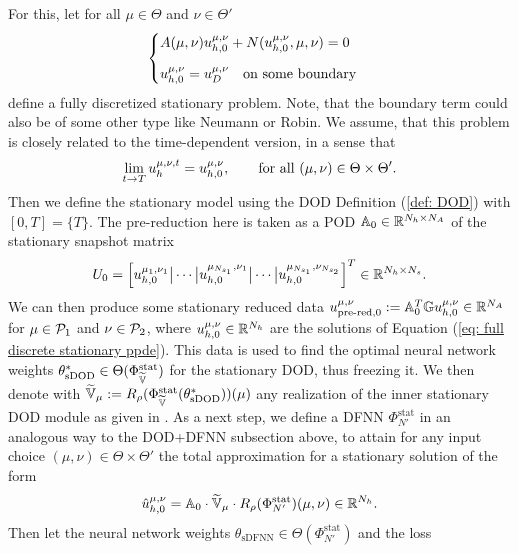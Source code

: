For this, let for all $\mu \in \Theta$ and $\nu \in \Theta'$
\begin{equation} \label{eq: full discrete stationary ppde}
    \begin{cases}
    \displaystyle
    A(\mu, \nu) u_{h, 0}^{\mu, \nu} + 
    N(u_{h, 0}^{\mu, \nu}, \mu, \nu)= 0\\[0.8em]
    \displaystyle
    u_{h, 0}^{\mu, \nu} = u_{D}^{\mu, \nu} \quad \text{on some boundary}
    \end{cases}
\end{equation}
define a fully discretized stationary problem. Note, that the boundary term could also be of some other type like
Neumann or Robin. We assume, that this problem is 
closely related to the time-dependent version, in a sense that
\begin{equation*}
    \lim\limits_{t \to T} u_h^{\mu, \nu, t} = u_{h, 0}^{\mu, \nu}, \qquad \text{for all } (\mu, \nu) \in \Theta \times \Theta'.
\end{equation*}
Then we define the stationary model using the DOD Definition (\ref{def: DOD}) with $[0, T] = \{T\}$.
The pre-reduction here is taken as a POD $\mathbb{A}_0 \in \mathbb{R}^{N_h \times N_A}$ of the stationary snapshot matrix
\begin{equation*}
    U_0 = \left[u_{h, 0}^{\mu_1, \nu_1} \big\vert \cdots \big\vert u_{h, 0}^{\mu_{N_{s_1}}, \nu_1} \big\vert \cdots \big\vert 
    u_{h, 0}^{\mu_{N_{s_1}}, \nu_{N_{s_2}}}\right]^T \in \mathbb{R}^{N_h \times N_s}.
\end{equation*}
We can then produce some stationary reduced data $u_{\text{pre-red}, 0}^{\mu, \nu} := \mathbb{A}_0^T \mathbb{G} u_{h, 0}^{\mu, \nu} \in \mathbb{R}^{N_A}$ for $\mu \in \mathcal{P}_1$
and $\nu \in \mathcal{P}_2$, where $u_{h, 0}^{\mu, \nu} \in \mathbb{R}^{N_h}$ are the solutions of Equation (\ref{eq: full discrete stationary ppde}).
This data is used to find the optimal neural network weights $\theta^*_\text{sDOD} \in \Theta(\Phi^\text{stat}_{\widetilde{\mathbb{V}}})$ 
for the stationary DOD, thus freezing it. 
We then denote with $\widetilde{\mathbb{V}}_\mu := R_\rho(\Phi^\text{stat}_{\widetilde{\mathbb{V}}}(\theta^*_\text{sDOD}))(\mu)$ 
any realization of the inner
stationary DOD module as given in \cite{franco2024}.
As a next step, we define a DFNN $\Phi^\text{stat}_{N'}$ in an analogous way to the DOD+DFNN subsection above, 
to attain for any 
input choice $(\mu, \nu) \in \Theta \times \Theta'$ the total approximation for a stationary solution of the form
\begin{equation*}
    \hat{u}_{h, 0}^{\mu, \nu} =  \mathbb{A}_0 \cdot \widetilde{\mathbb{V}}_{\mu} \cdot 
    R_\rho(\Phi^\text{stat}_{N'})(\mu, \nu) \in \mathbb{R}^{N_h}.
\end{equation*}
Then let the neural network weights $\theta_\text{sDFNN} \in \Theta(\Phi^\text{stat}_{N'})$ and the loss
